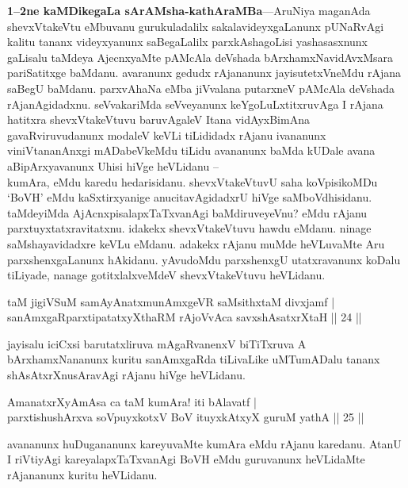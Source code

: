 \begin{artha}
\textbf{1--2ne kaMDikegaLa sArAMsha-kathAraMBa}---AruNiya maganAda 
shevxVtakeVtu eMbuvanu gurukuladalilx sakalavideyxgaLanunx pUNaRvAgi 
kalitu tananx videyxyanunx saBegaLalilx parxkAshagoLisi yashasasxnunx 
gaLisalu taMdeya AjecnxyaMte pAMcAla deVshada bArxhamxNavidAvxMsara 
pariSatitxge baMdanu. avaranunx gedudx rAjananunx jayisutetxVneMdu 
rAjana saBegU baMdanu. parxvAhaNa eMba jiVvalana putarxneV pAMcAla 
deVshada rAjanAgidadxnu. seVvakariMda seVveyanunx keYgoLuLxtitxruvAga 
I rAjana hatitxra shevxVtakeVtuvu baruvAgaleV Itana vidAyxBimAna 
gavaRviruvudanunx modaleV keVLi tiLididadx rAjanu ivananunx 
viniVtananAnxgi mADabeVkeMdu tiLidu avananunx baMda kUDale avana 
aBipArxyavanunx Uhisi hiVge heVLidanu --\\
kumAra, eMdu karedu hedarisidanu. shevxVtakeVtuvU saha koVpisikoMDu 
`BoVH' eMdu kaSxtirxyanige anucitavAgidadxrU hiVge saMboVdhisidanu. 
taMdeyiMda AjAcnxpisalapxTaTxvanAgi baMdiruveyeVnu? eMdu rAjanu 
parxtuyxtatxravitatxnu. idakekx shevxVtakeVtuvu hawdu eMdanu. ninage 
saMshayavidadxre keVLu eMdanu. adakekx rAjanu muMde heVLuvaMte Aru 
parxshenxgaLanunx hAkidanu. yAvudoMdu parxshenxgU utatxravanunx koDalu 
tiLiyade, nanage gotitxlalxveMdeV shevxVtakeVtuvu heVLidanu.
\end{artha}

\begin{shl}
taM jigiVSuM samAyAnatxmunAmxgeVR saMsithxtaM divxjamf | \\
sanAmxgaRparxtipatatxyXthaRM rAjoVvAca savxshAsatxrXtaH \hfill|| 24 || 
\end{shl}

\begin{artha}
jayisalu iciCxsi barutatxliruva mAgaRvanenxV biTiTxruva A 
bArxhamxNananunx kuritu sanAmxgaRda tiLivaLike uMTumADalu tananx 
shAsAtxrXnusAravAgi rAjanu hiVge heVLidanu.
\end{artha}

\begin{shl}
AmanatxrXyAmAsa ca taM kumAra! iti bAlavatf | \\
parxtishushArxva soV\s puyxkotxV BoV ituyxkAtxyX guruM yathA \hfill|| 25 || 
\end{shl}

\begin{artha}
avananunx huDugananunx kareyuvaMte kumAra eMdu rAjanu karedanu. AtanU 
I riVtiyAgi kareyalapxTaTxvanAgi BoVH eMdu guruvanunx heVLidaMte 
rAjananunx kuritu heVLidanu.
\end{artha}

